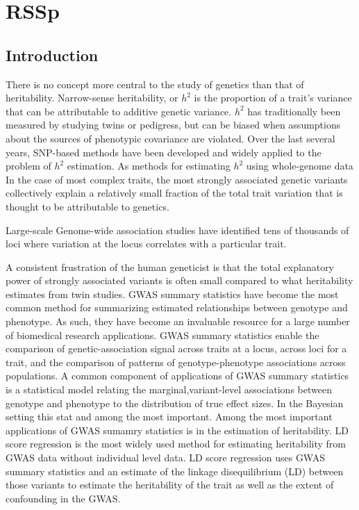 \chapter{RSSp}



\section{Introduction}\label{sec:org3c6cf58}




There is no concept more central to the study of genetics than that of heritability.  Narrow-sense heritability, or $h^2$ is the proportion of a trait's variance that can be attributable to additive genetic variance.  $h^2$ has traditionally been measured by studying twins or pedigress, but can be biased when assumptions about the sources of phenotypic covariance are violated\cite{keller2005quantifying}.
Over the last several years, SNP-based methods have been developed\cite{gcta} and widely applied to the problem of $h^2$ estimation.  
As methods for estimating $h^2$ using whole-genome data
In the case of most complex traits, the most strongly associated genetic variants collectively explain a relatively small fraction of the total trait variation that is thought to be attributable to genetics.


Large-scale Genome-wide association studies have identified tens of thousands of loci where variation at the locus correlates with a particular trait.

A consistent frustration of the human geneticist is that the total explanatory power of strongly associated variants is often small compared to what heritability estimates from twin studies.
GWAS summary statistics have become the most common method for summarizing estimated relationships between genotype and phenotype.
As such, they have become an invaluable resource for a large number of biomedical research applications\cite{Lyon_2020}.  GWAS summary statistics enable the comparison of genetic-association signal across traits at a locus\cite{phewas}, across loci for a trait\cite{firstGWAS}, and the comparison of patterns of genotype-phenotype associations across populations\cite{Rosenberg_2010}.
A common component of  applications of GWAS summary statistics is a statistical model relating the marginal,variant-level associations between genotype and phenotype to the distribution of true effect sizes.  In the Bayesian setting this stat and among the most important.  Among the most important applications of GWAS sumamry statistics is in the estimation of heritability. LD score regression is the most widely used method for estimating heritability from GWAS data without individual level data.  LD score regression uses GWAS summary statistics and an estimate of the linkage disequilibrium (LD) between those variants to estimate the heritability of the trait as well as the extent of confounding in the GWAS\cite{ldsc}.



